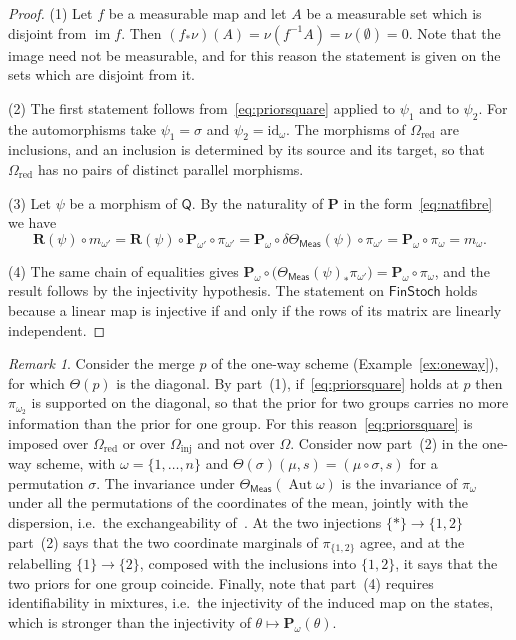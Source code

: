 \documentclass[11pt,a4paper]{article}
\theoremstyle{plain}
\theoremstyle{definition}
\theoremstyle{remark}
\newtheorem{remark}[theorem]{Remark}
\newcommand{\cat}[1]{\mathsf{#1}}
\newcommand{\catO}{\cat{\Omega}}
\newcommand{\Meas}{\cat{Meas}}
\newcommand{\FinStoch}{\cat{FinStoch}}
\newcommand{\id}{\mathrm{id}}
\newcommand{\del}{\delta}
\begin{document}
\begin{proof}
(1) Let $f$ be a measurable map and let $A$ be a measurable set which is
disjoint from $\operatorname{im} f$. Then
$(f_{*}\nu)(A) = \nu(f^{-1}A) = \nu(\emptyset) = 0$. Note that the image need
not be measurable, and for this reason the statement is given on the sets
which are disjoint from it.

(2) The first statement follows from~\eqref{eq:priorsquare} applied to
$\psi_1$ and to $\psi_2$. For the automorphisms take $\psi_1 = \sigma$ and
$\psi_2 = \id_{\omega}$. The morphisms of $\catO_{\mathrm{red}}$ are
inclusions, and an inclusion is determined by its source and its target, so
that $\catO_{\mathrm{red}}$ has no pairs of distinct parallel morphisms.

(3) Let $\psi$ be a morphism of $\cat{Q}$. By the naturality of $\mathbf P$ in
the form~\eqref{eq:natfibre} we have
\[
\mathbf{R}(\psi) \circ m_{\omega'} =
\mathbf{R}(\psi)\circ\mathbf P_{\omega'}\circ\pi_{\omega'} =
\mathbf P_{\omega}\circ\del\Theta_\Meas(\psi)\circ\pi_{\omega'} =
\mathbf P_{\omega}\circ\pi_{\omega} = m_{\omega}.
\]

(4) The same chain of equalities gives
$\mathbf P_{\omega}\circ\bigl(\Theta_\Meas(\psi)_{*}\pi_{\omega'}\bigr) =
\mathbf P_{\omega}\circ\pi_{\omega}$, and the result follows by the injectivity
hypothesis. The statement on $\FinStoch$ holds because a linear map is
injective if and only if the rows of its matrix are linearly independent.
\end{proof}

\begin{remark}\label{rem:coherence}
Consider the merge $p$ of the one-way scheme (Example~\ref{ex:oneway}), for
which $\Theta(p)$ is the diagonal. By part~(1), if~\eqref{eq:priorsquare}
holds at $p$ then $\pi_{\omega_2}$ is supported on the diagonal, so that the
prior for two groups carries no more information than the prior for one
group. For this reason~\eqref{eq:priorsquare} is imposed over
$\catO_{\mathrm{red}}$ or over $\catO_{\mathrm{inj}}$ and not over $\catO$.
Consider now part~(2) in the one-way scheme, with $\omega = \{1,\dots,n\}$ and
$\Theta(\sigma)(\mu,s) = (\mu\circ\sigma, s)$ for a permutation $\sigma$. The
invariance under $\Theta_\Meas(\operatorname{Aut}\omega)$ is the invariance of
$\pi_{\omega}$ under all the permutations of the coordinates of the mean,
jointly with the dispersion, i.e.\ the exchangeability
of~\cite[Def.~4.1]{fritz_definetti_2021}. At the two injections
$\{*\} \to \{1,2\}$ part~(2) says that the two coordinate marginals of
$\pi_{\{1,2\}}$ agree, and at the relabelling $\{1\} \to \{2\}$, composed with
the inclusions into $\{1,2\}$, it says that the two priors for one group
coincide. Finally, note that part~(4) requires identifiability in mixtures,
i.e.\ the injectivity of the induced map on the states, which is stronger than
the injectivity of $\theta \mapsto \mathbf P_{\omega}(\theta)$.
\end{remark}
\end{document}
